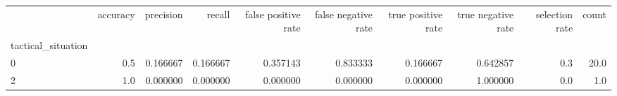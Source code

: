 \begin{tabular}{lrrrrrrrrr}
\toprule
{} &  accuracy &  precision &    recall &  false positive rate &  false negative rate &  true positive rate &  true negative rate &  selection rate &  count \\
tactical\_situation &           &            &           &                      &                      &                     &                     &                 &        \\
\midrule
0                  &       0.5 &   0.166667 &  0.166667 &             0.357143 &             0.833333 &            0.166667 &            0.642857 &             0.3 &   20.0 \\
2                  &       1.0 &   0.000000 &  0.000000 &             0.000000 &             0.000000 &            0.000000 &            1.000000 &             0.0 &    1.0 \\
\bottomrule
\end{tabular}
